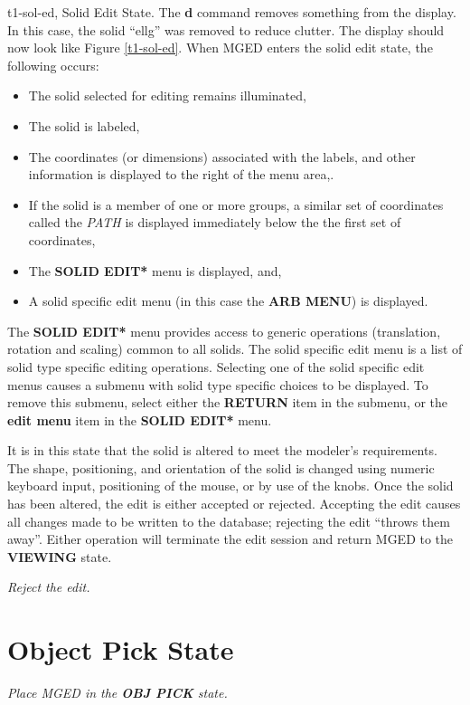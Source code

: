 \mfig t1-sol-ed, Solid Edit State.
The {\bf d} command removes something from the display.  In this
case, the solid ``ellg'' was removed to reduce clutter.
The display should now look like Figure \ref{t1-sol-ed}.
When MGED enters the solid edit state, the following occurs:
\begin{itemize}
\item The solid selected for editing remains illuminated,
\item The solid is labeled,
\item The coordinates (or dimensions) associated with the labels,
and other information is displayed to the right of the menu area,.
\item If the solid is a member of one or more groups, a similar set
of coordinates called the {\sl PATH} is displayed immediately below
the the first set of coordinates,
\item The {\bf *SOLID EDIT*} menu is displayed, and,
\item A solid specific edit menu (in this case the {\bf ARB MENU})
is displayed.
\end{itemize}

The {\bf *SOLID EDIT*} menu provides access to generic operations (translation, rotation
and scaling) common to all solids.
The solid specific edit menu is a list of solid type specific editing operations.
Selecting one of the solid specific edit menus causes a submenu with solid type specific
choices to be displayed.  To remove this submenu, select either the
{\bf RETURN} item in the submenu, or the {\bf edit menu} item in the
{\bf *SOLID EDIT*} menu.

It is in this state that the solid is altered to meet the modeler's
requirements. The shape, positioning, and orientation of the solid is
changed using numeric keyboard input, positioning of the mouse, or by
use of the knobs.  Once the solid has been altered, the edit is
either accepted or rejected.  Accepting the edit causes all changes
made to be written to the database; rejecting the edit ``throws them
away''. Either operation will terminate the edit session and return MGED
to the {\bf VIEWING} state.

\noindent
{\em Reject the edit.}\\

\section{Object Pick State}

\noindent
{\em Place MGED in the {\bf OBJ PICK} state.}\\

